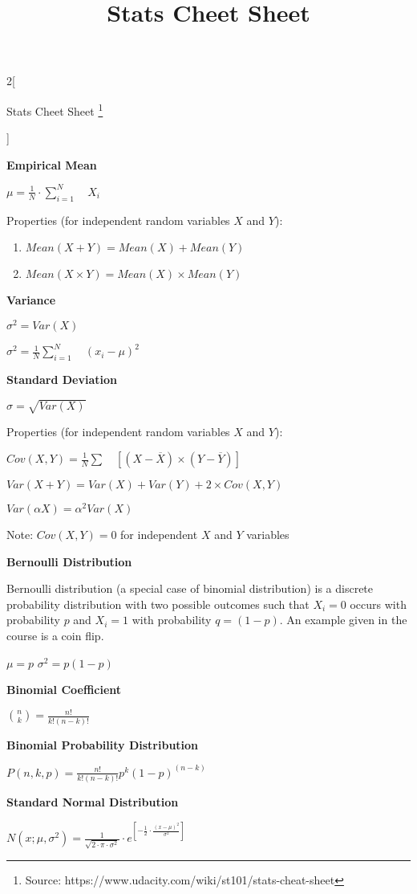 \documentclass[9pt]{article}
\title{Stats Cheet Sheet}
\date{}
\begin{document}
\begin{multicols}{2}[
	\begin{center}
		Stats Cheet Sheet \footnote{Source: https://www.udacity.com/wiki/st101/stats-cheat-sheet}
	\end{center}]

	\textbf{Empirical Mean}
	
	$\mu =\frac{1}{N}\cdot \sum _{i=1}^N\quad X_i$
	
	Properties (for independent random variables $X$ and $Y$):
	\begin{enumerate}
	    \item $Mean(X+Y)=Mean(X)+Mean(Y)$
	   \item  $Mean(X\times Y)=Mean(X)\times Mean(Y)$
	\end{enumerate}
	
	
	\textbf{Variance}
	
	$\sigma^2=Var(X)$
	
	$\sigma^2=\frac{1}{N}\sum_{i=1}^N\quad(x_i-\mu)^2$
	
	
	\textbf{Standard Deviation}
	
	$\sigma=\sqrt{Var(X)}$
	
	Properties (for independent random variables $X$ and $Y$):
	
	$Cov(X,Y)=\frac{1}{N}\sum\quad[(X-\overline{X})\times(Y-\overline{Y})]$
	
	$Var(X+Y)=Var(X)+Var(Y)+2\times Cov(X,Y)$
	
	$Var(\alpha X)=\alpha^2Var(X)$
	
	Note: $Cov(X,Y)=0$ for independent $X$ and $Y$ variables


	\textbf{Bernoulli Distribution}

	Bernoulli distribution (a special case of binomial distribution) is a discrete probability distribution with two possible outcomes such that $X_i=0$ occurs with probability $p$ and $X_i=1$ with probability $q=(1-p)$. An example given in the course is a coin flip.
	
	$\mu=p$ $\sigma^2=p(1-p)$
	

	\textbf{Binomial Coefficient}
	
	${{n}\choose{k}}=\frac{n!}{k!(n-k)!}$
	
	
	\textbf{Binomial Probability Distribution}
	
	$P(n,k,p)=\frac{n!}{k!(n-k)!}p^k(1-p)^{(n-k)}$
	
	
	\textbf{Standard Normal Distribution}
	
	$N(x;\mu,\sigma^2)=\frac{1}{\sqrt{2\cdot\pi\cdot\sigma^2}}\cdot e^{[-\frac{1}{2}\cdot\frac{(x-\mu)^2}{\sigma^2}]}$
	

\end{multicols}
\end{document}
